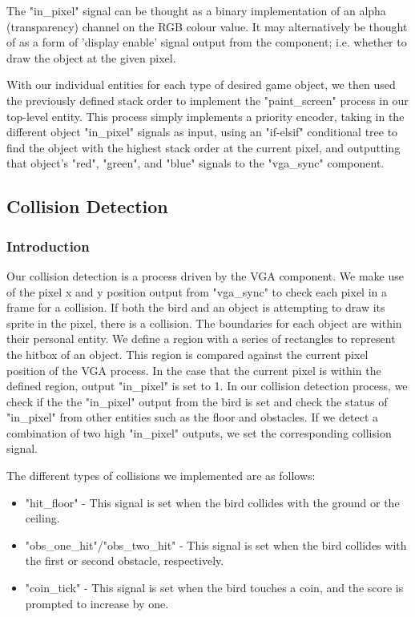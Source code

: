 \documentclass[conference]{IEEEtran}
\begin{document}
The "in\_pixel" signal can be thought as a binary implementation of an alpha (transparency) channel on the RGB colour value. It may alternatively be thought of as a form of 'display enable' signal output from the component; i.e. whether to draw the object at the given pixel.

With our individual entities for each type of desired game object, we then used the previously defined stack order to implement the "paint\_screen" process in our top-level entity. This process simply implements a priority encoder, taking in the different object "in\_pixel" signals as input, using an "if-elsif" conditional tree to find the object with the highest stack order at the current pixel, and outputting that object's "red", "green", and "blue" signals to the "vga\_sync" component.

\subsection{Collision Detection}
\subsubsection{Introduction}
Our collision detection is a process driven by the VGA component. We make use of the pixel x and y position output from "vga\_sync" to check each pixel in a frame for a collision. If both the bird and an object is attempting to draw its sprite in the pixel, there is a collision. The boundaries for each object are within their personal entity. We define a region with a series of rectangles to represent the hitbox of an object. This region is compared against the current pixel position of the VGA process. In the case that the current pixel is within the defined region, output "in\_pixel" is set to 1. In our collision detection process, we check if the the "in\_pixel" output from the bird is set and check the status of "in\_pixel" from other entities such as the floor and obstacles. If we detect a combination of two high "in\_pixel" outputs, we set the corresponding collision signal.

The different types of collisions we implemented are as follows:
\begin{itemize}
	\item "hit\_floor" - This signal is set when the bird collides with the ground or the ceiling.
	\item "obs\_one\_hit"/"obs\_two\_hit" - This signal is set when the bird collides with the first or second obstacle, respectively.
	\item "coin\_tick" - This signal is set when the bird touches a coin, and the score is prompted to increase by one.
\end{itemize}
\end{document}
